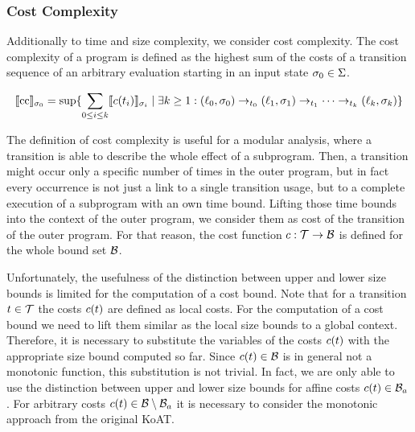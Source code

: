 \subsubsection{Cost Complexity}

Additionally to time and size complexity, we consider cost complexity.
The cost complexity of a program is defined as the highest sum of the costs of a transition sequence of an arbitrary evaluation starting in an input state $\sigma_0 \in \Sigma$.

\begin{definition}
\[ \llbracket \text{cc} \rrbracket_{\sigma_0} = \sup \lbrace  \sum_{0 \leq i \leq k} \llbracket c(t_i) \rrbracket_{\sigma_i} \mid \exists k \geq 1: 
  (\ell_0, \sigma_0) \rightarrow_{t_0} (\ell_1, \sigma_1) \rightarrow_{t_1} \dots \rightarrow_{t_k} (\ell_k, \sigma_k)  \rbrace \]
\end{definition}

The definition of cost complexity is useful for a modular analysis, where a transition is able to describe the whole effect of a subprogram.
Then, a transition might occur only a specific number of times in the outer program, but in fact every occurrence is not just a link to a single transition usage, but to a complete execution of a subprogram with an own time bound.
Lifting those time bounds into the context of the outer program, we consider them as cost of the transition of the outer program. 
For that reason, the cost function $c: \mathcal{T} \rightarrow \mathcal{B}$ is defined for the whole bound set $\mathcal{B}$.

Unfortunately, the usefulness of the distinction between upper and lower size bounds is limited for the computation of a cost bound.
Note that for a transition $t \in \mathcal{T}$ the costs $c(t)$ are defined as local costs.
For the computation of a cost bound we need to lift them similar as the local size bounds to a global context.
Therefore, it is necessary to substitute the variables of the costs $c(t)$ with the appropriate size bound computed so far.
Since $c(t) \in \mathcal{B}$ is in general not a monotonic function, this substitution is not trivial.
In fact, we are only able to use the distinction between upper and lower size bounds for affine costs $c(t) \in \mathcal{B}_a$.
For arbitrary costs $c(t) \in \mathcal{B} \setminus \mathcal{B}_a$ it is necessary to consider the monotonic approach from the original KoAT.


